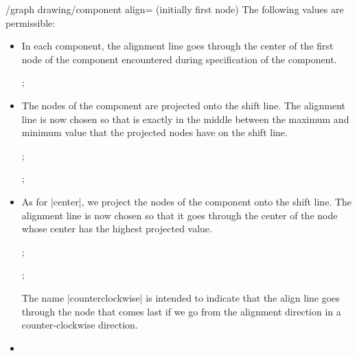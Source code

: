 \begin{key}{/graph drawing/component align= (initially first node)}
  The following values are permissible:
  \begin{itemize}
  \item {}
    In each component, the alignment line goes through the center of
    the first node of the component encountered during specification
    of the component.
\begin{codeexample}[]
\tikz {};
\end{codeexample}
  \item {}
    
    The nodes of the component are projected onto the shift line. The
    alignment line is now chosen so that is exactly in the middle
    between the maximum and minimum value that the projected nodes
    have on the shift line.
\begin{codeexample}[]
\tikz {};
\end{codeexample}
\begin{codeexample}[]
\tikz {};
\end{codeexample}
  \item {}

    As for |center|, we project the nodes of the component onto the
    shift line. The alignment line is now chosen so that it goes
    through the center of the node whose center has the highest
    projected value.
\begin{codeexample}[]
\tikz {};
\end{codeexample}
\begin{codeexample}[]
\tikz {};
\end{codeexample}
    The name |counterclockwise| is intended to indicate that the align
    line goes through the node that comes last if we go from the
    alignment direction in a counter-clockwise direction.
  \item {}
    

\end{itemize}
\end{key}

